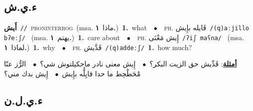 \documentclass[10pt,a4paper,twoside]{article} %
\begin{document}
\begin{multicols}{2}
\vspace{-3mm}
\subsection*{\color{blue}\foreignlanguage{arabic}{ء.ي.ش}\color{blue}{ (ntws)}} 

{\setlength\topsep{0pt}\textbf{\foreignlanguage{arabic}{أَيش}}\ {\color{gray}\texttt{//}\color{black}}\ \textsc{pron\textunderscore interrog}\ \color{gray}(msa. \foreignlanguage{arabic}{ماذا}~\foreignlanguage{arabic}{\textbf{١.}})\color{black}\ \textbf{1.}~what\ \ $\bullet$\ \ \textsc{ph.} \color{gray} \foreignlanguage{arabic}{قَايله بإِيش}\color{black}\ {\color{gray}\texttt{/{\sffamily (q)aːjillo bʔeːʃ}/}\color{black}}\ \color{gray} (msa. \foreignlanguage{arabic}{يهتم}~\foreignlanguage{arabic}{\textbf{١.}})\color{black}\ \textbf{1.}~care about\ \ $\bullet$\ \ \textsc{ph.} \color{gray} \foreignlanguage{arabic}{إِيش مَعْنَى}\color{black}\ {\color{gray}\texttt{/{\sffamily ʔiʃ maʕna}/}\color{black}}\ \color{gray} (msa. \foreignlanguage{arabic}{لماذا}~\foreignlanguage{arabic}{\textbf{١.}})\color{black}\ \textbf{1.}~why\ \ $\bullet$\ \ \textsc{ph.} \color{gray} \foreignlanguage{arabic}{قَدَّيش}\color{black}\ {\color{gray}\texttt{/{\sffamily (q)addeːʃ}/}\color{black}}\ \textbf{1.}~how much?\  \begin{flushright}\color{gray}\foreignlanguage{arabic}{\textbf{\underline{\foreignlanguage{arabic}{أمثلة}}}: قَدِّيش حق الزيت البكر؟\ $\bullet$\ \  إِيش معنى نادر ماحكيلتوش شي؟\ $\bullet$\ \  الرُّز عنّا مْحَطْحِط ما حدا قايِلُّه بإِيش\ $\bullet$\ \  إِيش بدك مني؟}\end{flushright}\color{black}} \vspace{2mm}

\vspace{-3mm}
\subsection*{\color{blue}\foreignlanguage{arabic}{ء.ي.ل.ن}\color{blue}{ (ntws)}} 


\end{multicols}
\end{document}
